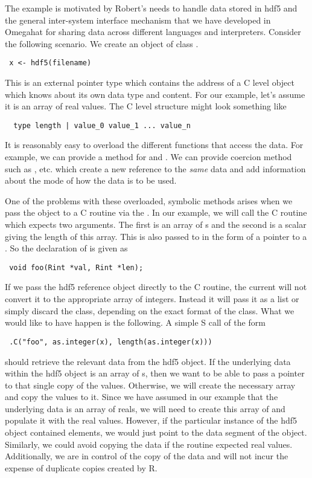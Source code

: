 \documentclass{article}
\begin{document}
The example is motivated by Robert's needs to handle data stored in
hdf5 and the general inter-system interface mechanism that we have
developed in Omegahat for sharing data across different languages and
interpreters.  Consider the following scenario.  We create an object
of class .
\begin{verbatim}
 x <- hdf5(filename)
\end{verbatim}
This is an external pointer type which contains the address of a C
level object which knows about its own data type and content. For our
example, let's assume it is an array of real values.  The C level
structure might look something like
\begin{verbatim}
  type length | value_0 value_1 ... value_n
\end{verbatim}

It is reasonably easy to overload the different functions that access
the data.  For example, we can provide a method for 
and \SFunction{[}. We can provide coercion method such as
, etc.  which create a new reference to the
\textit{same} data and add information about the mode of how the data
is to be used.

One of the problems with these overloaded, symbolic methods arises
when we pass the object to a C routine via the .  In our
example, we will call the C routine  which expects two
arguments. The first is an array of s and the second is a
scalar giving the length of this array.  This is also passed to
 in the form of a pointer to a .  So the
declaration of  is given as
\begin{verbatim}
 void foo(Rint *val, Rint *len); 
\end{verbatim}

If we pass the hdf5 reference object directly to the C routine, the
current  will not convert it to the appropriate
array of integers. Instead it will pass it as a list or simply discard
the class, depending on the exact format of the  class.
What we would like to have happen is the following.
A simple S call of the form
\begin{verbatim}
 .C("foo", as.integer(x), length(as.integer(x)))
\end{verbatim}
should retrieve the relevant data from the hdf5 object.  If the
underlying data within the hdf5 object is an array of s,
then we want to be able to pass a pointer to that single copy of the
values. Otherwise, we will create the necessary array and copy the
values to it.  Since we have assumed in our example that the
underlying data is an array of reals, we will need to create this
array of  and populate it with the real values.  However,
if the particular instance of the hdf5 object contained 
elements, we would just point to the data segment of the
object. Similarly, we could avoid copying the data if the routine
expected real values.  Additionally, we are in control of the copy of
the data and will not incur the expense of duplicate copies created by
R.
\end{document}
